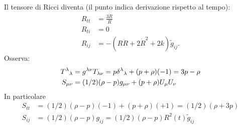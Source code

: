 Il tensore di Ricci diventa (il punto indica derivazione rispetto al tempo):
\begin{subequations}
  \begin{align}
    R_{tt} &= \frac{ 3 \ddot{R}}{R} \\
    R_{ti} &= 0 \\
    R_{ij} &= -(R\ddot{R}+2\dot{R}^2+2k) \tilde{g}_{ij}.
  \end{align}
\end{subequations}
Osserva:
\begin{subequations}
  \begin{align}
    \tensor{T}{^{\lambda}}{_{\lambda}} &= g^{\lambda\nu} T_{\lambda\nu} = p
    \tensor{\delta}{^{\lambda}}_{{\lambda}} + (p+\rho) (-1) = 3p - \rho \\
    S_{\mu \nu} &= (1/2) (\rho-p) g_{\mu\nu}+(p+\rho)U_{\mu} U_{\nu}
  \end{align}
\end{subequations}
In particolare
\begin{subequations}
  \begin{align}
    S_{tt} &= (1/2) (\rho-p)(-1)+(p+\rho)(+1) = (1/2)(\rho+3p) \\
    \label{sij}
    S_{ij} &= (1/2)(\rho-p) g_{ij}= (1/2)(\rho-p) R^2(t) \tilde{g}_{ij}
  \end{align}
\end{subequations}

